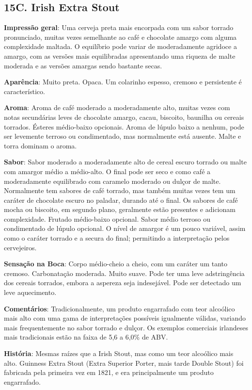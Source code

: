\subsection*{15C. Irish Extra Stout}
\textbf{Impressão geral}: Uma cerveja preta mais encorpada com um sabor torrado pronunciado, muitas vezes semelhante ao café e chocolate amargo com alguma complexidade maltada. O equilíbrio pode variar de moderadamente agridoce a amargo, com as versões mais equilibradas apresentando uma riqueza de malte moderada e as versões amargas sendo bastante secas.

\textbf{Aparência}: Muito preta. Opaca. Um colarinho espesso, cremoso e persistente é característico.

\textbf{Aroma}: Aroma de café moderado a moderadamente alto, muitas vezes com notas secundárias leves de chocolate amargo, cacau, biscoito, baunilha ou cereais torrados. Ésteres médio-baixo opcionais. Aroma de lúpulo baixo a nenhum, pode ser levemente terroso ou condimentado, mas normalmente está ausente. Malte e torra dominam o aroma.

\textbf{Sabor}: Sabor moderado a moderadamente alto de cereal escuro torrado ou malte com amargor médio a médio-alto. O final pode ser seco e como café a moderadamente equilibrado com caramelo moderado ou dulçor de malte. Normalmente tem sabores de café torrado, mas também muitas vezes tem um caráter de chocolate escuro no paladar, durando até o final. Os sabores de café mocha ou biscoito, em segundo plano, geralmente estão presentes e adicionam complexidade. Frutado médio-baixo opcional. Sabor médio terroso ou condimentado de lúpulo opcional. O nível de amargor é um pouco variável, assim como o caráter torrado e a secura do final; permitindo a interpretação pelos cervejeiros.

\textbf{Sensação na Boca}: Corpo médio-cheio a cheio, com um caráter um tanto cremoso. Carbonatação moderada. Muito suave. Pode ter uma leve adstringência dos cereais torrados, embora a aspereza seja indesejável. Pode ser detectado um leve aquecimento.

\textbf{Comentários}: Tradicionalmente, um produto engarrafado
com teor alcoólico mais alto com uma gama de interpretações
possíveis igualmente válidas, variando mais frequentemente
no sabor torrado e dulçor. Os exemplos comerciais irlandeses
mais tradicionais estão na faixa de 5,6 a 6,0\% de ABV.

\textbf{História}: Mesmas raízes que a Irish Stout, mas como um teor alcoólico mais alto. Guinness Extra Stout (Extra Superior Porter, mais tarde Double Stout) foi fabricada pela primeira vez em 1821, e era principalmente um produto engarrafado.

